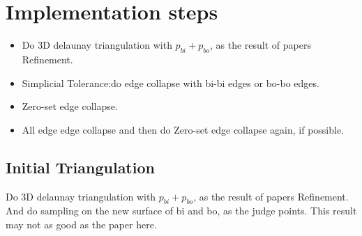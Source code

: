 \documentclass{article}
\theoremstyle{definition}
\theoremstyle{remark}
\begin{document}
  \section{Implementation steps}
  \begin{itemize}
    \item Do 3D delaunay triangulation with $p_{bi}+p_{bo}$, as the result of papers Refinement.
    \item Simplicial Tolerance:do edge collapse with bi-bi edges or bo-bo edges.
    \item Zero-set edge collapse.
    \item All edge edge collapse and then do Zero-set edge collapse again, if possible.
  \end{itemize}
  \subsection{Initial Triangulation}
  Do 3D delaunay triangulation with $p_{bi}+p_{bo}$, as the result of papers Refinement.
  And do sampling on the new surface of bi and bo, as the judge points. This result may not as good as the paper here.
\end{document}
